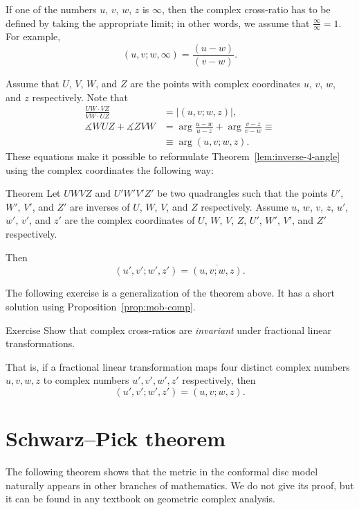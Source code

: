If one of the numbers $u$, $v$, $w$, $z$ is $\infty$, 
then the complex cross-ratio has to be defined by taking the appropriate limit; in other words, we assume that $\frac\infty\infty=1$.
For example,
$$(u, v; w, \infty)=\frac{(u-w)}{(v-w)}.$$

Assume that $U$, $V$, $W$, and  $Z$ are the points with complex coordinates  
$u$, $v$, $w$, and $z$ respectively.
Note that 
\begin{align*}
\frac{UW\cdot VZ}{VW\cdot UZ}&=|(u,v;w,z)|,
\\
\measuredangle WUZ +\measuredangle ZVW&=\arg\frac{u-w}{u-z}+\arg\frac{v-z}{v-w}\equiv 
\\
&\equiv \arg(u,v;w,z).
\end{align*}
These equations make it possible to reformulate Theorem~\ref{lem:inverse-4-angle} using the complex coordinates
the following way:

\begin{thm}{Theorem}\label{lem:inverse-4-angle-C}
Let $UWVZ$ and $U'W'V'Z'$  be two quadrangles 
such that the points $U'$, $W'$, $V'$, and $Z'$ are inverses of $U$, $W$, $V$, and $Z$ respectively.
Assume $u$, $w$, $v$, $z$, $u'$, $w'$, $v'$, and $z'$ are the complex coordinates of $U$, $W$, $V$, $Z$, $U'$, $W'$, $V'$, and $Z'$ respectively.

Then 
$$(u',v';w',z')=\overline{(u,v;w,z)}.$$

\end{thm}

The following exercise is a generalization of the theorem above.
It has a short solution using Proposition~\ref{prop:mob-comp}.

\begin{thm}{Exercise}\label{ex:C-cross-ratio}
Show that 
complex cross-ratios are {}\emph{invariant} under fractional linear transformations. 

That is, if a fractional linear transformation maps four distinct complex numbers $u, v, w, z$ to complex numbers $u', v', w', z'$ respectively, then
$$
(u',v';w',z')
=
(u,v;w,z).
$$

\end{thm}

\section*{Schwarz--Pick theorem}
The following theorem shows 
that the metric in the conformal disc model naturally appears in other branches of mathematics.
We do not give its proof, but it can be found in any textbook on geometric complex analysis.

